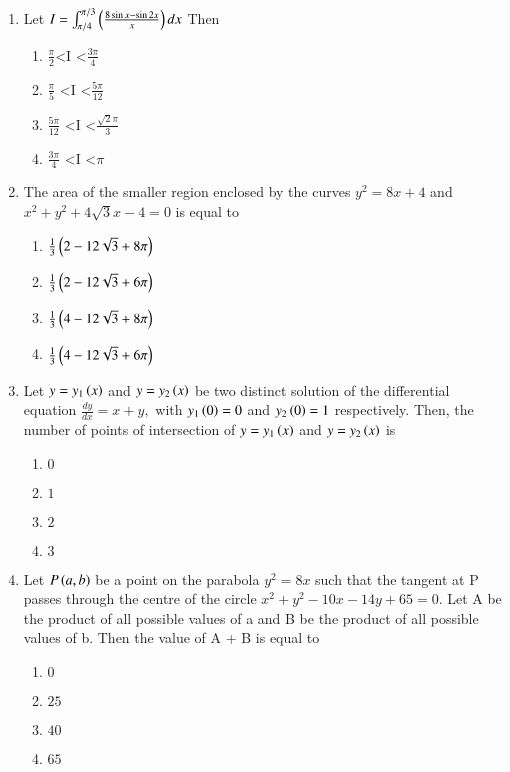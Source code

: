 \documentclass[journal,12pt,twocolumn]{IEEEtran}
\theoremstyle{remark}
\begin{document}
\begin{enumerate}[start=1]
\item  Let $I = \int_{\pi / 4}^{\pi /3}\left( \frac{8\sin x - \sin 2x}{x} \right)dx$ Then
\hfill{}
	\begin{enumerate}
    \item $ \frac{\pi}{2}$\textless I \textless $\frac{3\pi}{4}$
    \item $ \frac{\pi}{5}$ \textless I \textless $\frac{5\pi}{12}$
    \item $ \frac{5\pi}{12}$ \textless I \textless $\frac{\sqrt{2}\pi}{3}$
    \item $ \frac{3\pi}{4}$ \textless I \textless $\pi$
\end{enumerate}
\item The area of the smaller region enclosed by the curves $y^2=8x+4$ and $x^2 +y^2 + 4\sqrt{3}x-4 =0$ is equal to
\hfill{}
	\begin{enumerate}
    \item $ \frac{1}{3}\left(2-12\sqrt{3} + 8\pi\right)$
    \item $ \frac{1}{3}\left(2-12\sqrt{3} + 6\pi\right)$
    \item $ \frac{1}{3}\left(4-12\sqrt{3} + 8\pi\right)$
    \item $ \frac{1}{3}\left(4-12\sqrt{3} + 6\pi\right)$
\end{enumerate}
\item  Let $y=y_1\left(x\right)$ and $y=y_2\left(x\right)$ be two distinct solution of the differential equation $\frac{dy}{dx}=x+y,$ with $y_1\left(0\right)=0$ and $y_2\left(0\right)=1$  respectively. Then, the number of points of intersection of $y=y_1\left(x\right)$ and $y=y_2\left(x\right)$ is
\hfill{}
	\begin{enumerate}
    \item $0$
    \item $1$
    \item $2$
    \item $3$
\end{enumerate}
\item Let $P\left(a,b\right)$  be a point on the parabola $y^2=8x$ such that the tangent at P passes through the centre of the circle $x^2+y^2-10x-14y+65=0$. Let A be the product of all possible values of a and B be the product of all possible values of b. Then the value of A + B is equal to
\hfill{}
	\begin{enumerate}
    \item $0$
    \item $25$
    \item $40$
    \item $65$

\end{enumerate}
\end{enumerate}
\end{document}
